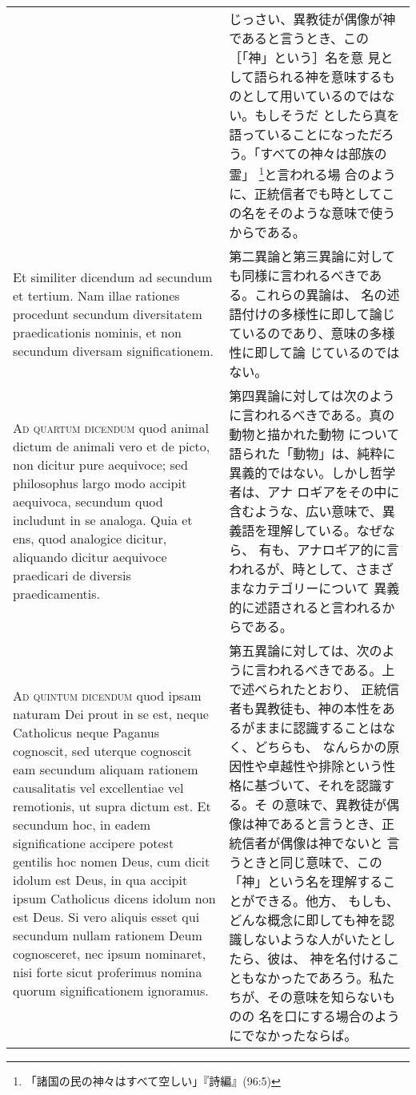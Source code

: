\documentclass[10pt]{jsarticle}
\begin{document}
\begin{longtable}{p{21em}p{21em}}
&

じっさい、異教徒が偶像が神であると言うとき、この［「神」という］名を意
見として語られる神を意味するものとして用いているのではない。もしそうだ
としたら真を語っていることになっただろう。「すべての神々は部族の霊」
\footnote{「諸国の民の神々はすべて空しい」『詩編』(96:5)}と言われる場
合のように、正統信者でも時としてこの名をそのような意味で使うからである。

\\

Et similiter dicendum ad secundum et tertium. Nam illae rationes
procedunt secundum diversitatem praedicationis nominis, et non
secundum diversam significationem.

&

第二異論と第三異論に対しても同様に言われるべきである。これらの異論は、
名の述語付けの多様性に即して論じているのであり、意味の多様性に即して論
じているのではない。

\\

{\scshape Ad quartum dicendum} quod animal dictum de animali vero et
de picto, non dicitur pure aequivoce; sed philosophus largo modo
accipit aequivoca, secundum quod includunt in se analoga. Quia et ens,
quod analogice dicitur, aliquando dicitur aequivoce praedicari de
diversis praedicamentis.

&

第四異論に対しては次のように言われるべきである。真の動物と描かれた動物
について語られた「動物」は、純粋に異義的ではない。しかし哲学者は、アナ
ロギアをその中に含むような、広い意味で、異義語を理解している。なぜなら、
有も、アナロギア的に言われるが、時として、さまざまなカテゴリーについて
異義的に述語されると言われるからである。

\\

{\scshape Ad quintum dicendum} quod ipsam naturam Dei prout in se est,
neque Catholicus neque Paganus cognoscit, sed uterque cognoscit eam
secundum aliquam rationem causalitatis vel excellentiae vel
remotionis, ut supra dictum est. Et secundum hoc, in eadem
significatione accipere potest gentilis hoc nomen Deus, cum dicit
idolum est Deus, in qua accipit ipsum Catholicus dicens idolum non est
Deus. Si vero aliquis esset qui secundum nullam rationem Deum
cognosceret, nec ipsum nominaret, nisi forte sicut proferimus nomina
quorum significationem ignoramus.

&

第五異論に対しては、次のように言われるべきである。上で述べられたとおり、
正統信者も異教徒も、神の本性をあるがままに認識することはなく、どちらも、
なんらかの原因性や卓越性や排除という性格に基づいて、それを認識する。そ
の意味で、異教徒が偶像は神であると言うとき、正統信者が偶像は神でないと
言うときと同じ意味で、この「神」という名を理解することができる。他方、
もしも、どんな概念に即しても神を認識しないような人がいたとしたら、彼は、
神を名付けることもなかったであろう。私たちが、その意味を知らないものの
名を口にする場合のようにでなかったならば。

\end{longtable}
\newpage
{}
\end{document}
